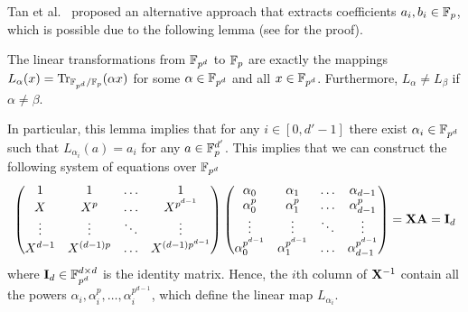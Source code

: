   Tan et al.~\cite{TLWRK20} proposed an alternative approach that extracts coefficients $a_i, b_i \in \mathbb{F}_p$, which is possible due to the following lemma (see \cite[Theorem 2.24]{LN86} for the proof).
  \begin{lemma}\label{lem:extraction}
    The linear transformations from $\mathbb{F}_{p^d}$ to $\mathbb{F}_p$ are exactly the mappings $L_{\alpha}(x) = \mathrm{Tr}_{\mathbb{F}_{p^d}/\mathbb{F}_p}(\alpha x)$ for some $\alpha \in \mathbb{F}_{p^d}$ and all $x \in \mathbb{F}_{p^d}$.
    Furthermore, $L_{\alpha} \ne L_{\beta}$ if $\alpha \ne \beta$.
  \end{lemma}
  In particular, this lemma implies that for any $i \in [0,d'-1]$ there exist $\alpha_i \in \mathbb{F}_{p^d}$ such that $L_{\alpha_i}(a) = a_i$ for any $a \in \mathbb{F}_p^{d'}$.
  This implies that we can construct the following system of equations over $\mathbb{F}_{p^d}$ 
  \begin{align*}
    \begin{pmatrix}
      1       & 1       & \dots   & 1             \\
      X       & X^p     & \dots   & X^{p^{d-1}}   \\
      \vdots  & \vdots  & \ddots  & \vdots        \\
      X^{d-1}     & X^{(d-1)p}    & \dots   & X^{(d-1)p^{d-1}}  \\
    \end{pmatrix}
    \begin{pmatrix}
      \alpha_0      & \alpha_1      & \dots   & \alpha_{d-1}      \\
      \alpha_0^{p}  & \alpha_1^{p}  & \dots   & \alpha_{d-1}^{p}  \\
      \vdots        & \vdots        & \ddots  & \vdots            \\
      \alpha_0^{p^{d-1}}  & \alpha_1^{p^{d-1}}  & \dots   & \alpha_{d-1}^{p^{d-1}}  \\
    \end{pmatrix}
    =
    \mathbf{X} \mathbf{A}
    =
    \mathbf{I}_{d}
  \end{align*}
  where $\mathbf{I}_d \in \mathbb{F}_{p^d}^{d \times d}$ is the identity matrix.
  Hence, the $i$th column of ${{\mathbf{X}}^{-1}}$ contain all the powers $\alpha_i, \alpha_i^p, \dots, \alpha_i^{p^{d-1}}$, which define the linear map $L_{\alpha_i}$.

